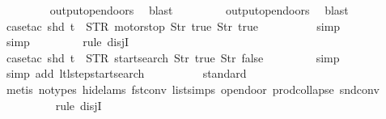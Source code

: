 \begin{isabellebody}
\ \ \ \ \ \ \ \isamarkupfalse%
\ output{\isacharunderscore}opendoors\ \isamarkupfalse%
\ blast\isanewline
\ \ \ \ \ \ \ \isamarkupfalse%
\ output{\isacharunderscore}opendoors\ \isamarkupfalse%
\ blast\isanewline
\ \ \ \ \ \ \ \isamarkupfalse%
\ {\isacharparenleft}case{\isacharunderscore}tac\ {\isachardoublequoteopen}{\isacharparenleft}shd\ t{\isacharparenright}\ {\isacharequal}\ {\isacharparenleft}STR\ {\isacharprime}{\isacharprime}motorstop{\isacharprime}{\isacharprime}{\isacharcomma}\ {\isacharbrackleft}Str\ {\isacharprime}{\isacharprime}true{\isacharprime}{\isacharprime}{\isacharcomma}\ Str\ {\isacharprime}{\isacharprime}true{\isacharprime}{\isacharprime}{\isacharbrackright}{\isacharparenright}{\isachardoublequoteclose}{\isacharparenright}\isanewline
\ \ \ \ \ \ \ \ \isamarkupfalse%
\ simp\isanewline
\ \ \ \ \ \ \ \isamarkupfalse%
\ simp\isanewline
\ \ \ \ \ \ \ \isamarkupfalse%
\ {\isacharparenleft}rule\ disjI{}{\isacharparenright}\isanewline
\ \ \ \ \ \ \ \isamarkupfalse%
\ {\isacharparenleft}case{\isacharunderscore}tac\ {\isachardoublequoteopen}{\isacharparenleft}shd\ t{\isacharparenright}\ {\isacharequal}\ {\isacharparenleft}STR\ {\isacharprime}{\isacharprime}startsearch{\isacharprime}{\isacharprime}{\isacharcomma}\ {\isacharbrackleft}Str\ {\isacharprime}{\isacharprime}true{\isacharprime}{\isacharprime}{\isacharcomma}\ Str\ {\isacharprime}{\isacharprime}false{\isacharprime}{\isacharprime}{\isacharbrackright}{\isacharparenright}{\isachardoublequoteclose}{\isacharparenright}\isanewline
\ \ \ \ \ \ \ \isamarkupfalse%
\ simp\isanewline
\ \ \ \ \ \ \ \ \isamarkupfalse%
\ {\isacharparenleft}simp\ add{\isacharcolon}\ ltl{\isacharunderscore}step{\isacharunderscore}startsearch{\isacharparenright}\isanewline
\ \ \ \ \ \ \ \ \isamarkupfalse%
\ standard\isanewline
\ \ \ \ \ \ \ \isamarkupfalse%
\ {\isacharparenleft}metis\ {\isacharparenleft}no{\isacharunderscore}types{\isacharcomma}\ hide{\isacharunderscore}lams{\isacharparenright}\ fst{\isacharunderscore}conv\ list{\isachardot}simps{\isacharparenleft}{}{\isacharparenright}\ opendoor{\isacharunderscore}{}\ prod{\isachardot}collapse\ snd{\isacharunderscore}conv{\isacharparenright}\isanewline
\ \ \ \ \ \ \ \ \isamarkupfalse%
\ {\isacharparenleft}rule\ disjI{}{\isacharparenright}\isanewline
\ \ \ \ \ \ \ \ \isamarkupfalse%

\end{isabellebody}
